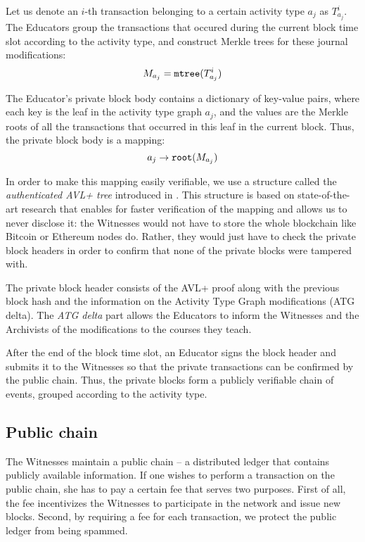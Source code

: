 Let us denote an $i$-th transaction belonging to a certain activity type $a_j$ as $T_{a_j}^i$. The Educators group the transactions that occured during the current block time slot according to the activity type, and construct Merkle trees \cite{merkle1989certified} for these journal modifications:
\begin{equation}
M_{a_j} = \mathtt{mtree}(T_{a_j}^i)
\end{equation}

The Educator's private block body contains a dictionary of key-value pairs, where each key is the leaf in the activity type graph $a_j$, and the values are the Merkle roots of all the transactions that occurred in this leaf in the current block. Thus, the private block body is a mapping:
\begin{equation}
a_j \rightarrow \mathtt{root}(M_{a_j})
\end{equation}

In order to make this mapping easily verifiable, we use a structure called the \textit{authenticated AVL+ tree} introduced in \cite{reyzin2016improving}. This structure is based on state-of-the-art research that enables for faster verification of the mapping and allows us to never disclose it: the Witnesses would not have to store the whole blockchain like Bitcoin or Ethereum nodes do. Rather, they would just have to check the private block headers in order to confirm that none of the private blocks were tampered with.

The private block header consists of the AVL+ proof along with the previous block hash and the information on the Activity Type Graph modifications (ATG delta). The \textit{ATG delta} part allows the Educators to inform the Witnesses and the Archivists of the modifications to the courses they teach.

After the end of the block time slot, an Educator signs the block header and submits it to the Witnesses so that the private transactions can be confirmed by the public chain. Thus, the private blocks form a publicly verifiable chain of events, grouped according to the activity type.

\subsection{Public chain}
The Witnesses maintain a public chain -- a distributed ledger that contains publicly available information. If one wishes to perform a transaction on the public chain, she has to pay a certain fee that serves two purposes. First of all, the fee incentivizes the Witnesses to participate in the network and issue new blocks. Second, by requiring a fee for each transaction, we protect the public ledger from being spammed.

